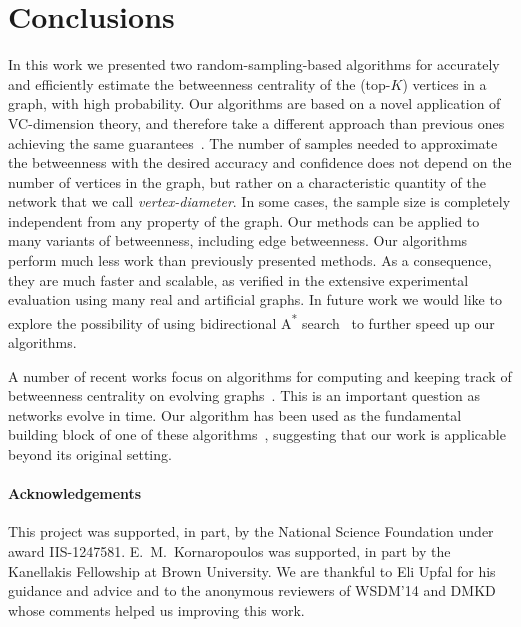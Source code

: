 \section{Conclusions}\label{sec:concl}
In this work we presented two random-sampling-based algorithms for accurately and
efficiently estimate the betweenness centrality of the (top-$K$) vertices in a
graph, with high probability.
Our algorithms are based on a novel application of VC-dimension theory, and
therefore take a different approach than previous ones achieving the same
guarantees~\citep{BrandesP07,GeisbergerSS08,JacobKLPT05}. The number of samples
needed to approximate the betweenness with the desired accuracy and confidence
does not depend on the number of vertices in the graph, but rather on a
characteristic quantity of the network that we call
\emph{vertex-diameter}. In some cases, the sample size is completely
independent from any property of the graph. %
\ifproof
Our methods can be applied to many variants of betweenness, including edge
betweenness. %
\fi
Our algorithms perform much less work than previously presented methods. %
As a consequence, they are much faster and
scalable, as verified in the extensive experimental
evaluation using many real and artificial graphs. 
\ifdmkd
\else
In future work we would like
to explore the possibility of using bidirectional A\textsuperscript{*}
search~\citep{Pohl69,KaindlK97} to further speed up our algorithms.  
\fi

A number of recent works focus on algorithms for computing and keeping track of
betweenness centrality on evolving
graphs~\citep{KourtellisMB14,Yoshida14,BergaminiMS15,BergaminiM15}. This is an
important question as networks evolve in time. Our algorithm has been used as
the fundamental building block of one of these
algorithms~\citep{BergaminiMS15,BergaminiM15}, suggesting that our work is
applicable beyond its original setting.


\ifdmkd
\else
\paragraph*{Acknowledgements} This project was supported, in part, by the
National Science Foundation under award IIS-1247581. E.~M.~Kornaropoulos was
supported, in part by the Kanellakis Fellowship at Brown University. We are
thankful to Eli Upfal for his guidance and advice and to the anonymous reviewers
of WSDM'14 and DMKD whose comments helped us improving this work.
\fi

